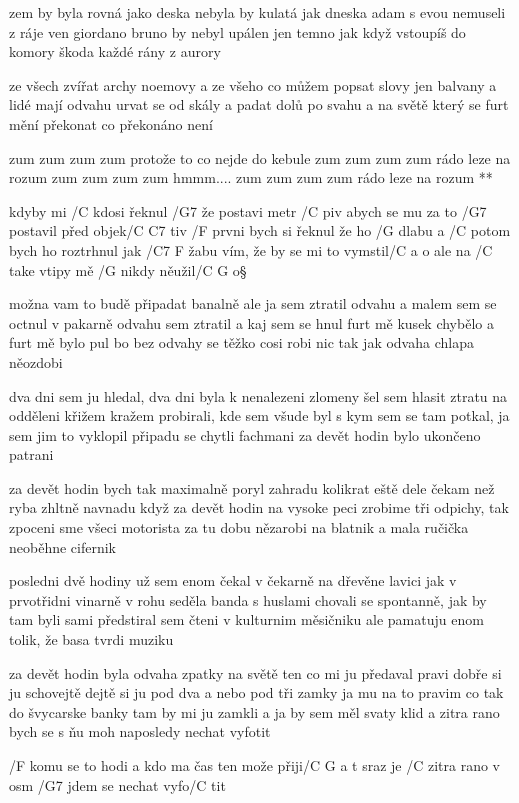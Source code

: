 zem by byla rovná jako deska 
nebyla by kulatá jak dneska
adam s evou nemuseli z ráje ven
giordano bruno by nebyl upálen
jen temno jak když vstoupíš do komory
škoda každé rány z aurory \s

ze všech zvířat archy noemovy
a ze všeho co můžem popsat slovy
jen balvany a lidé mají odvahu
urvat se od skály a padat dolů po svahu
a na světě který se furt mění
překonat co překonáno není

\R  zum zum zum zum protože to co nejde do kebule
    zum zum zum zum rádo leze na rozum
    zum zum zum zum hmmm....
    zum zum zum zum rádo leze na rozum **




kdyby mi /C kdosi řeknul /G7 že postavi metr /C piv
abych se mu za to /G7 postavil před objek/{C C7} tiv
/F prvni bych si řeknul že ho /G dlabu
a /C potom bych ho roztrhnul jak /{C7 F} žabu
vím, že by se mi to vymstil/{C a} o
ale na /C take vtipy mě /G nikdy něužil/{C G} o\S

možna vam to budě připadat banalně
ale ja sem ztratil odvahu a malem sem se octnul v pakarně
odvahu sem ztratil a kaj sem se hnul
furt mě kusek chybělo a furt mě bylo pul
bo bez odvahy se těžko cosi robi
nic tak jak odvaha chlapa něozdobi \s

dva dni sem ju hledal, dva dni byla k nenalezeni
zlomeny šel sem hlasit ztratu na odděleni
křižem kražem probirali, kde sem všude byl
s kym sem se tam potkal, ja sem jim to vyklopil
připadu se chytli fachmani
za devět hodin bylo ukončeno patrani \s

za devět hodin bych tak maximalně poryl zahradu
kolikrat eště dele čekam než ryba zhltně navnadu
když za devět hodin na vysoke peci
zrobime tři odpichy, tak zpoceni sme všeci
motorista za tu dobu nězarobi na blatnik
a mala ručička neoběhne cifernik \s

posledni dvě hodiny už sem enom čekal v čekarně
na dřevěne lavici jak v prvotřidni vinarně
v rohu seděla banda s huslami
chovali se spontanně, jak by tam byli sami
předstiral sem čteni v kulturnim měsičniku
ale pamatuju enom tolik, že basa tvrdi muziku \songgg

za devět hodin byla odvaha zpatky na světě
ten co mi ju předaval pravi dobře si ju schovejtě
dejtě si ju pod dva a nebo pod tři zamky
ja mu na to pravim co tak do švycarske banky
tam by mi ju zamkli a ja by sem měl svaty klid
a zitra rano bych se s ňu moh naposledy nechat vyfotit \s

/F komu se to hodi a kdo ma čas ten može přiji/{C G a} t
sraz je /C zitra rano v osm /G7 jdem se nechat vyfo/C tit



